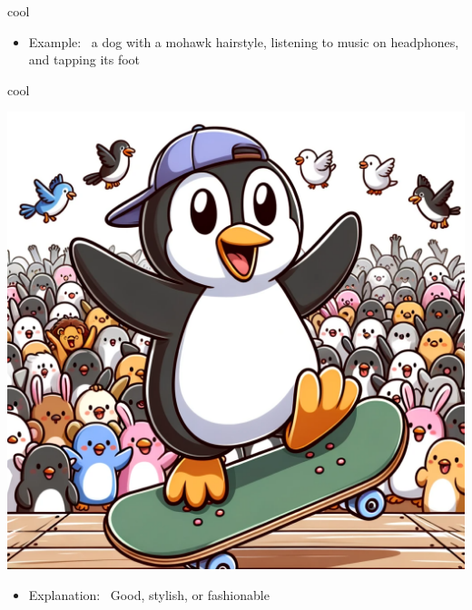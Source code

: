 \documentclass[avery5371, grid,frame]{flashcards}
\begin{document}
\begin{flashcard}{cool}
\begin{center}
\begin{minipage}[c]{.45\textwidth}
\begin{itemize}
            \item Example: \ a dog with a mohawk hairstyle, listening to music on headphones, and tapping its foot
            \end{itemize}
        \end{minipage}
    \end{center}
    \vspace*{\fill}
\end{flashcard}\begin{flashcard}{cool}
    \vspace*{\fill}
    \begin{center}
        \begin{minipage}[c]{.45\textwidth}
            \includegraphics[width=\textwidth]{cards/c/cool/cool - a penguin on a skateboard doing a trick with a crowd of animals cheering.png}
        \end{minipage}
        \begin{minipage}[c]{.45\textwidth}
            \begin{itemize}\setlength\itemsep{12pt}
            \item Explanation: \ Good, stylish, or fashionable


\end{itemize}
\end{minipage}
\end{center}
\end{flashcard}
\end{document}
